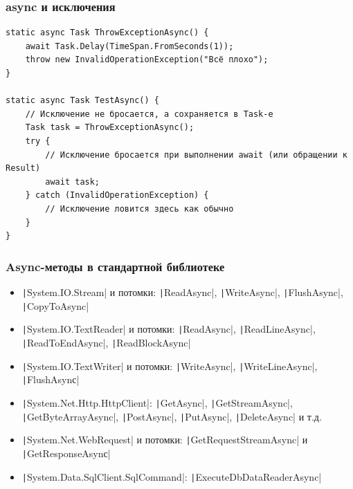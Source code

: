 \documentclass[xetex,mathserif,serif]{beamer}
\begin{document}
    \begin{frame}[fragile]
        \frametitle{async и исключения}
        \begin{footnotesize}
            \begin{verbatim}
static async Task ThrowExceptionAsync() {
    await Task.Delay(TimeSpan.FromSeconds(1));
    throw new InvalidOperationException("Всё плохо");
}

static async Task TestAsync() {
    // Исключение не бросается, а сохраняется в Task-е
    Task task = ThrowExceptionAsync();
    try {
        // Исключение бросается при выполнении await (или обращении к Result)
        await task;
    } catch (InvalidOperationException) {
        // Исключение ловится здесь как обычно
    }
}
            \end{verbatim}
        \end{footnotesize}
    \end{frame}

    \begin{frame}
        \frametitle{Async-методы в стандартной библиотеке}
        \begin{itemize}
            \item \texttt|System.IO.Stream| и потомки: \texttt|ReadAsync|, \texttt|WriteAsync|, \texttt|FlushAsync|, \texttt|CopyToAsync|
            \item \texttt|System.IO.TextReader| и потомки: \texttt|ReadAsync|, \texttt|ReadLineAsync|, \texttt|ReadToEndAsync|, \texttt|ReadBlockAsync|
            \item \texttt|System.IO.TextWriter| и потомки: \texttt|WriteAsync|, \texttt|WriteLineAsync|, \texttt|FlushAsynс|
            \item \texttt|System.Net.Http.HttpClient|: \texttt|GetAsync|, \texttt|GetStreamAsync|, \texttt|GetByteArrayAsync|, \texttt|PostAsync|, \texttt|PutAsync|, \texttt|DeleteAsync| и т.д.
            \item \texttt|System.Net.WebRequest| и потомки: \texttt|GetRequestStreamAsync| и \texttt|GetResponseAsynс|
            \item \texttt|System.Data.SqlClient.SqlCommand|: \texttt|ExecuteDbDataReaderAsync|
        \end{itemize}
    \end{frame}
\end{document}
